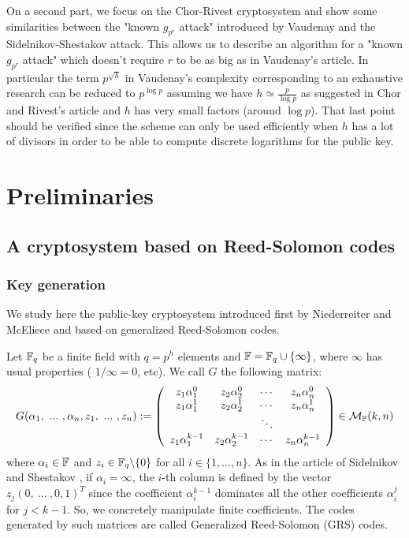 \documentclass[12pt,a4paper,titlepage]{article}
\begin{document}
On a second part, we focus on the Chor-Rivest cryptosystem and show some similarities between the "known $g_{p^r}$ attack" introduced by Vaudenay and the Sidelnikov-Shestakov attack. This allows us to describe an algorithm for a "known $g_{p^r}$ attack" which doesn't require $r$ to be as big as in Vaudenay's article. In particular the term $p^{\sqrt{h}}$ in Vaudenay's complexity corresponding to an exhaustive research can be reduced to $p^{\log p}$ assuming we have $h \simeq \frac{p}{\log p}$ as suggested in Chor and Rivest's article and $h$ has very small factors (around $\log p$). That last point should be verified since the scheme can only be used efficiently when $h$ has a lot of divisors in order to be able to compute discrete logarithms for the public key.



\newpage
\section{Preliminaries}
\label{sec:Prel}


\subsection{A cryptosystem based on Reed-Solomon codes}
\subsubsection{Key generation}

We study here the public-key cryptosystem introduced first by Niederreiter and McEliece \cite{NiederH86} and based on generalized Reed-Solomon codes.

Let $\mathbb{F}_q$ be a finite field with $q = p^h$ elements and $\mathbb{F} = \mathbb{F}_q \cup \{ \infty \}$, where $\infty$ has usual properties ( $1/\infty = 0$, etc). We call $G$ the following matrix:
$$ G(\alpha_1, \ ... \ , \alpha_n, z_1, \ ... \ , z_n) := \left(
\begin{array}{cccc}
z_1 \alpha_1^0 &  z_2 \alpha_2^0 & \cdots & z_n \alpha_n^0 \\
z_1 \alpha_1^1 &  z_2 \alpha_2^1 & \cdots & z_n \alpha_n^1 \\
 & & \ddots & \\
z_1 \alpha_1^{k-1} &  z_2 \alpha_2^{k-1} & \cdots & z_n \alpha_n^{k-1}
\end{array}
\right) \in \mathcal{M}_{\mathbb{F}}(k,n) $$
where $\alpha_i \in \mathbb{F}$ and $z_i \in \mathbb{F}_q\backslash\{0\}$ for all $i \in \{1,...,n\}$.
As in the article of Sidelnikov and Shestakov \cite{SidelShes92}, if $\alpha_i=\infty$, the $i$-th column is defined by the vector $z_j(0, \ ... \ , 0,1)^{T}$ since the coefficient $\alpha_i^{k-1}$ dominates all the other coefficients $\alpha_i^{j}$ for $j<k-1$.
So, we concretely manipulate finite coefficients. The codes generated by such matrices are called Generalized Reed-Solomon (GRS) codes.
\end{document}
